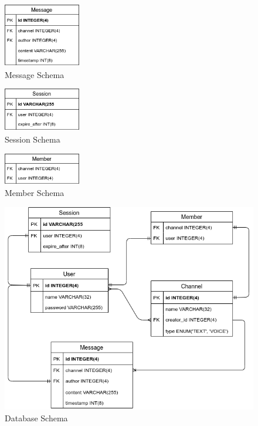 \begin{figure}[h!]
    \caption{Message Schema}
    \label{image:messageSchema}
    \centering
    \includegraphics[width=0.3\textwidth]{images/MessageSchema.png}
\end{figure}

\begin{figure}[h!]
    \caption{Session Schema}
    \label{image:sessionSchema}
    \centering
    \includegraphics[width=0.3\textwidth]{images/SessionSchema.png}
\end{figure}

\begin{figure}[h!]
    \caption{Member Schema}
    \label{image:memberSchema}
    \centering
    \includegraphics[width=0.3\textwidth]{images/MemberSchema.png}
\end{figure}

\begin{figure}[h!]
    \caption{Database Schema}
    \label{image:databaseSchema}
    \centering
    \includegraphics[width=1\textwidth]{images/FullSchemaDesign.png}
\end{figure}